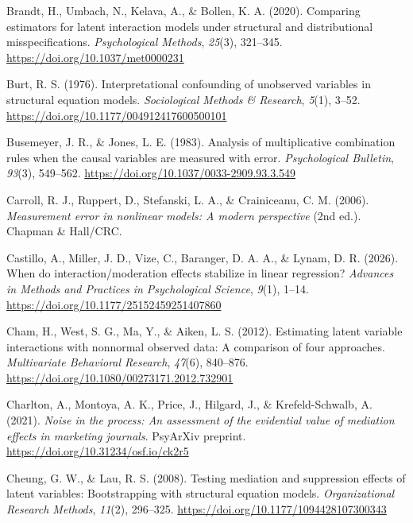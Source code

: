 \documentclass[
  man,
  longtable,
  nolmodern,
  notxfonts,
  notimes,
  colorlinks=true,linkcolor=blue,citecolor=blue,urlcolor=blue]{apa7}
\newlength{\cslhangindent}
\newenvironment{CSLReferences}[2] %
 {\begin{list}{}{%
  \setlength{\itemindent}{0pt}
  \setlength{\leftmargin}{0pt}
  \setlength{\parsep}{0pt}
  \ifodd #1
   \setlength{\leftmargin}{\cslhangindent}
   \setlength{\itemindent}{-1\cslhangindent}
  \fi
  \setlength{\itemsep}{#2\baselineskip}}}
 {\end{list}}
\begin{document}
\begin{CSLReferences}{1}{0}
Brandt, H., Umbach, N., Kelava, A., \& Bollen, K. A. (2020). Comparing
estimators for latent interaction models under structural and
distributional misspecifications. \emph{Psychological Methods},
\emph{25}(3), 321--345. \url{https://doi.org/10.1037/met0000231}

Burt, R. S. (1976). Interpretational confounding of unobserved variables
in structural equation models. \emph{Sociological Methods \& Research},
\emph{5}(1), 3--52. \url{https://doi.org/10.1177/004912417600500101}

Busemeyer, J. R., \& Jones, L. E. (1983). Analysis of multiplicative
combination rules when the causal variables are measured with error.
\emph{Psychological Bulletin}, \emph{93}(3), 549--562.
\url{https://doi.org/10.1037/0033-2909.93.3.549}

Carroll, R. J., Ruppert, D., Stefanski, L. A., \& Crainiceanu, C. M.
(2006). \emph{Measurement error in nonlinear models: A modern
perspective} (2nd ed.). Chapman \& Hall/CRC.

Castillo, A., Miller, J. D., Vize, C., Baranger, D. A. A., \& Lynam, D.
R. (2026). When do interaction/moderation effects stabilize in linear
regression? \emph{Advances in Methods and Practices in Psychological
Science}, \emph{9}(1), 1--14.
\url{https://doi.org/10.1177/25152459251407860}

Cham, H., West, S. G., Ma, Y., \& Aiken, L. S. (2012). Estimating latent
variable interactions with nonnormal observed data: A comparison of four
approaches. \emph{Multivariate Behavioral Research}, \emph{47}(6),
840--876. \url{https://doi.org/10.1080/00273171.2012.732901}

Charlton, A., Montoya, A. K., Price, J., Hilgard, J., \&
Krefeld-Schwalb, A. (2021). \emph{Noise in the process: An assessment of
the evidential value of mediation effects in marketing journals}.
PsyArXiv preprint. \url{https://doi.org/10.31234/osf.io/ck2r5}

Cheung, G. W., \& Lau, R. S. (2008). Testing mediation and suppression
effects of latent variables: Bootstrapping with structural equation
models. \emph{Organizational Research Methods}, \emph{11}(2), 296--325.
\url{https://doi.org/10.1177/1094428107300343}


\end{CSLReferences}
\end{document}
